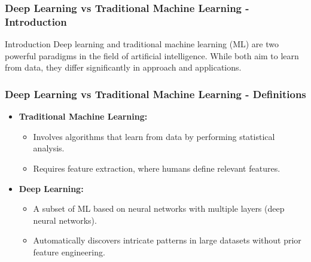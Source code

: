 \documentclass[aspectratio=169]{beamer}
\begin{document}
\begin{frame}[fragile]
  \frametitle{Deep Learning vs Traditional Machine Learning - Introduction}
  \begin{block}{Introduction}
  Deep learning and traditional machine learning (ML) are two powerful paradigms in the field of artificial intelligence. While both aim to learn from data, they differ significantly in approach and applications.
  \end{block}
\end{frame}

\begin{frame}[fragile]
  \frametitle{Deep Learning vs Traditional Machine Learning - Definitions}
  \begin{itemize}
    \item \textbf{Traditional Machine Learning:}
      \begin{itemize}
        \item Involves algorithms that learn from data by performing statistical analysis. 
        \item Requires feature extraction, where humans define relevant features.
      \end{itemize}
    
    \item \textbf{Deep Learning:}
      \begin{itemize}
        \item A subset of ML based on neural networks with multiple layers (deep neural networks).
        \item Automatically discovers intricate patterns in large datasets without prior feature engineering.
      \end{itemize}
  \end{itemize}
\end{frame}
\end{document}
